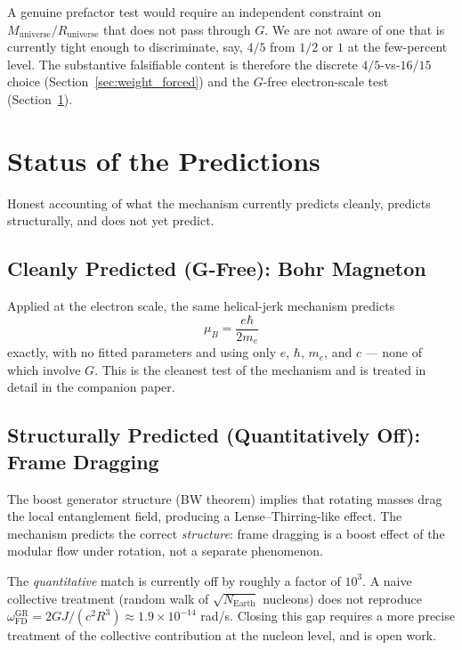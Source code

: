 \documentclass[11pt,letterpaper]{article}
\newcommand{\Runiv}{R_{\mathrm{universe}}}
\newcommand{\Muniv}{M_{\mathrm{universe}}}
\begin{document}
A genuine prefactor test would require an independent constraint on
$\Muniv/\Runiv$ that does not pass through $G$. We are not aware of one
that is currently tight enough to discriminate, say, $4/5$ from $1/2$ or
$1$ at the few-percent level. The substantive falsifiable content is therefore
the discrete $4/5$-vs-$16/15$ choice (Section~\ref{sec:weight_forced}) and the
$G$-free electron-scale test (Section~\ref{sec:status_predictions}).

\section{Status of the Predictions}
\label{sec:status_predictions}

Honest accounting of what the mechanism currently predicts cleanly,
predicts structurally, and does not yet predict.

\subsection{Cleanly Predicted (G-Free): Bohr Magneton}

Applied at the electron scale, the same helical-jerk mechanism predicts
\begin{equation}
  \mu_B = \frac{e \hbar}{2 m_e}
  \label{eq:bohr_magneton_ref}
\end{equation}
exactly, with no fitted parameters and using only $e$, $\hbar$, $m_e$,
and $c$ --- none of which involve $G$. This is the cleanest test of the
mechanism and is treated in detail in the companion paper.

\subsection{Structurally Predicted (Quantitatively Off): Frame Dragging}

The boost generator structure (BW theorem) implies that rotating masses
drag the local entanglement field, producing a Lense--Thirring-like
effect. The mechanism predicts the correct \emph{structure}: frame
dragging is a boost effect of the modular flow under rotation, not a
separate phenomenon.

The \emph{quantitative} match is currently off by roughly a factor of
$10^3$. A naive collective treatment (random walk of $\sqrt{N_{\mathrm{Earth}}}$
nucleons) does not reproduce $\omega_{\mathrm{FD}}^{\mathrm{GR}} =
2GJ/(c^2 R^3) \approx 1.9 \times 10^{-14}$ rad/s. Closing this gap
requires a more precise treatment of the collective contribution at
the nucleon level, and is open work.
\end{document}
